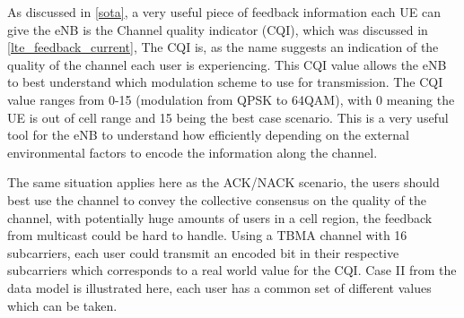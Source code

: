 \documentclass{article}
\begin{document}



As discussed in \cref{sota}, a very useful piece of feedback information each UE can give the eNB is the Channel quality indicator (CQI), which was discussed in \cref{lte_feedback_current}, The CQI is, as the name suggests an indication of the quality of the channel each user is experiencing. This CQI value allows the eNB to best understand which modulation scheme to use for transmission. The CQI value ranges from 0-15 (modulation from QPSK to 64QAM), with 0 meaning the UE is out of cell range and 15 being the best case scenario. This is a very useful tool for the eNB to understand how efficiently depending on the external environmental factors to encode the information along the channel. 

The same situation applies here as the ACK/NACK scenario, the users should best use the channel to convey the collective consensus on the quality of the channel, with potentially huge amounts of users in a cell region, the feedback from multicast could be hard to handle. Using a TBMA channel with 16 subcarriers, each user could transmit an encoded bit in their respective subcarriers which corresponds to a real world value for the CQI. Case II from the data model is illustrated here, each user has a common set of different values which can be taken. 
\end{document}
